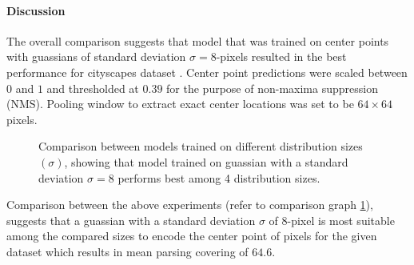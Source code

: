 \paragraph{Discussion}

The overall comparison suggests that model that was trained on center points with guassians of standard deviation $\sigma = 8$-pixels resulted in the best performance for cityscapes dataset \cite{Cordts2015}. Center point predictions were scaled between $0$ and $1$ and thresholded at $0.39$ for the purpose of non-maxima suppression (NMS). Pooling window to extract exact center locations was set to be $64\times64$ pixels. 

\begin{figure}[!ht]
\centering
{} 
\label{fig:bargraph_centerpoints}
\caption[Bar Graph for Gaussian Distribution Size Comparison]{Comparison between models trained on different distribution sizes $(\sigma)$, showing that model trained on guassian with a standard deviation $\sigma=8$ performs best among 4 distribution sizes.}
\end{figure}


Comparison between the above experiments (refer to comparison graph \ref{fig:bargraph_centerpoints}),  suggests that a guassian with a standard deviation $\sigma$ of 8-pixel is most suitable among the compared sizes to encode the center point of pixels for the given dataset which results in mean parsing covering of $\mathbf{64.6}$.

